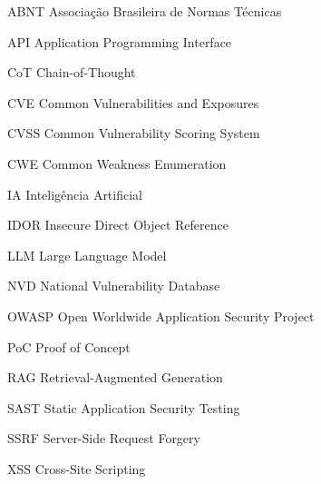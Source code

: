 \begin{siglas}
  \item[ABNT] Associação Brasileira de Normas Técnicas
  \item[API] Application Programming Interface
  \item[CoT] Chain-of-Thought
  \item[CVE] Common Vulnerabilities and Exposures
  \item[CVSS] Common Vulnerability Scoring System
  \item[CWE] Common Weakness Enumeration
  \item[IA] Inteligência Artificial
  \item[IDOR] Insecure Direct Object Reference
  \item[LLM] Large Language Model
  \item[NVD] National Vulnerability Database
  \item[OWASP] Open Worldwide Application Security Project
  \item[PoC] Proof of Concept
  \item[RAG] Retrieval-Augmented Generation
  \item[SAST] Static Application Security Testing
  \item[SSRF] Server-Side Request Forgery
  \item[XSS] Cross-Site Scripting
\end{siglas}
